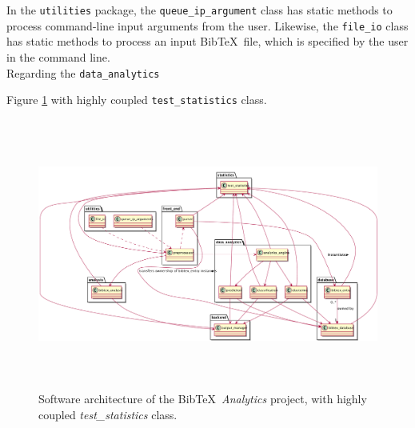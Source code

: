 In the {\tt utilities} package, the {\tt queue\_ip\_argument} class has static methods to process command-line input arguments from the user. Likewise, the {\tt file\_io} class has static methods to process an input {\sc Bib}\TeX\ file, which is specified by the user in the command line. \\

Regarding the {\tt data\_analytics}

Figure \ref{fig:SoftwareArchitectureWithHigherCoupling} with highly coupled {\tt test\_statistics} class.











\begin{figure}[h]
\centering 
\includegraphics[height=3.5in]{pics/sw-arch-higher-coupling/sw-arch}
\caption{Software architecture of the {\sc Bib}\TeX\ {\it Analytics} project, with highly coupled {\it test\_statistics} class.}
\label{fig:SoftwareArchitectureWithHigherCoupling}
\end{figure}










































